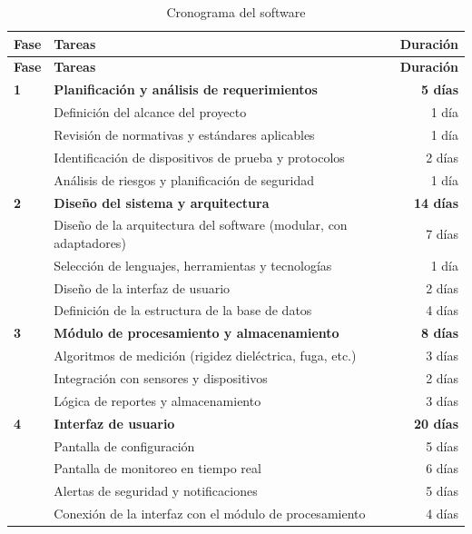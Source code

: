\begin{longtable}{@{} l p{8.5cm} r @{}}
\caption{Cronograma del software}\label{tab:cronograma_sw}\\
\toprule
\textbf{Fase} & \textbf{Tareas} & \textbf{Duración} \\
\midrule
\endfirsthead
\toprule
\textbf{Fase} & \textbf{Tareas} & \textbf{Duración} \\
\midrule
\endhead
\textbf{1} & \textbf{Planificación y análisis de requerimientos} & \textbf{5 días} \\
  & Definición del alcance del proyecto                       & 1 día \\
  & Revisión de normativas y estándares aplicables            & 1 día \\
  & Identificación de dispositivos de prueba y protocolos     & 2 días \\
  & Análisis de riesgos y planificación de seguridad          & 1 día \\
\midrule
\textbf{2} & \textbf{Diseño del sistema y arquitectura}        & \textbf{14 días} \\
  & Diseño de la arquitectura del software (modular, con adaptadores) & 7 días \\
  & Selección de lenguajes, herramientas y tecnologías        & 1 día \\
  & Diseño de la interfaz de usuario                          & 2 días \\
  & Definición de la estructura de la base de datos           & 4 días \\
\midrule
\textbf{3} & \textbf{Módulo de procesamiento y almacenamiento} & \textbf{8 días} \\
  & Algoritmos de medición (rigidez dieléctrica, fuga, etc.)  & 3 días \\
  & Integración con sensores y dispositivos                   & 2 días \\
  & Lógica de reportes y almacenamiento                       & 3 días \\
\midrule
\textbf{4} & \textbf{Interfaz de usuario}                      & \textbf{20 días} \\
  & Pantalla de configuración                                 & 5 días \\
  & Pantalla de monitoreo en tiempo real                      & 6 días \\
  & Alertas de seguridad y notificaciones                     & 5 días \\
  & Conexión de la interfaz con el módulo de procesamiento    & 4 días \\

\end{longtable}
